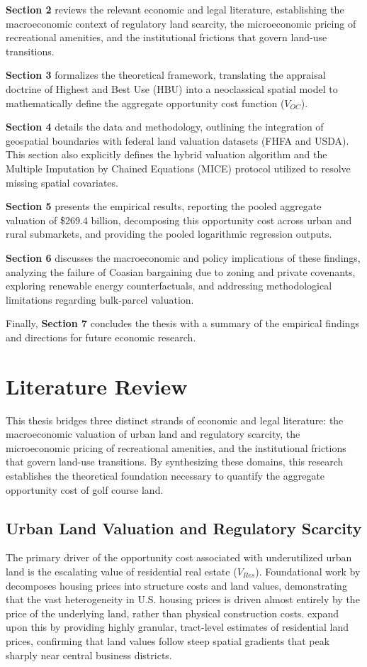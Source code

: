 \documentclass[10pt, letterpaper]{article}
\begin{document}
\textbf{Section 2} reviews the relevant economic and legal literature, establishing the macroeconomic context of regulatory land scarcity, the microeconomic pricing of recreational amenities, and the institutional frictions that govern land-use transitions. 

\textbf{Section 3} formalizes the theoretical framework, translating the appraisal doctrine of Highest and Best Use (HBU) into a neoclassical spatial model to mathematically define the aggregate opportunity cost function ($V_{OC}$). 

\textbf{Section 4} details the data and methodology, outlining the integration of geospatial boundaries with federal land valuation datasets (FHFA and USDA). This section also explicitly defines the hybrid valuation algorithm and the Multiple Imputation by Chained Equations (MICE) protocol utilized to resolve missing spatial covariates. 

\textbf{Section 5} presents the empirical results, reporting the pooled aggregate valuation of \$269.4 billion, decomposing this opportunity cost across urban and rural submarkets, and providing the pooled logarithmic regression outputs. 

\textbf{Section 6} discusses the macroeconomic and policy implications of these findings, analyzing the failure of Coasian bargaining due to zoning and private covenants, exploring renewable energy counterfactuals, and addressing methodological limitations regarding bulk-parcel valuation. 

Finally, \textbf{Section 7} concludes the thesis with a summary of the empirical findings and directions for future economic research.

\newpage

\section{Literature Review}


This thesis bridges three distinct strands of economic and legal literature: the macroeconomic valuation of urban land and regulatory scarcity, the microeconomic pricing of recreational amenities, and the institutional frictions that govern land-use transitions. By synthesizing these domains, this research establishes the theoretical foundation necessary to quantify the aggregate opportunity cost of golf course land.

\subsection{Urban Land Valuation and Regulatory Scarcity}
The primary driver of the opportunity cost associated with underutilized urban land is the escalating value of residential real estate ($V_{Res}$). Foundational work by \textcite{Davis2008} decomposes housing prices into structure costs and land values, demonstrating that the vast heterogeneity in U.S. housing prices is driven almost entirely by the price of the underlying land, rather than physical construction costs. \textcite{Davis2021} expand upon this by providing highly granular, tract-level estimates of residential land prices, confirming that land values follow steep spatial gradients that peak sharply near central business districts. 
\end{document}
